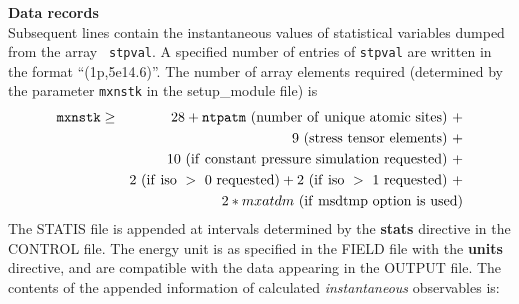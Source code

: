 {\bf Data records}\\ Subsequent lines contain the instantaneous
values of statistical variables dumped from the array {\tt
stpval}.  A specified number of entries of {\tt stpval} are
written in the format ``(1p,5e14.6)''.  The number of array
elements required (determined by the parameter {\tt mxnstk} in the
{\sc setup\_module} file) is
\begin{eqnarray}
{\tt mxnstk} & \ge & 28 + {\tt ntpatm}~(\rm number~of~unique~atomic~sites) ~+ \nonumber \\
             &     & 9~(\rm stress~tensor~elements) ~+ \nonumber \\
             &     & 10~(\rm if~constant~pressure~simulation~requested) ~+ \nonumber \\
             &     & 2~(\rm if~iso~>~0~requested) + 2~(\rm if~iso~>~1~requested) ~+ \nonumber \\
             &     & 2*mxatdm~(\rm if~msdtmp~option~is~used) \nonumber
\end{eqnarray}
The STATIS file is appended at intervals determined by the {\bf
stats} directive in the CONTROL file.  The energy unit is as
specified in the FIELD file with the {\bf units} directive, and
are compatible with the data appearing in the OUTPUT file.  The
contents of the appended information of calculated
{\em instantaneous} observables is:
